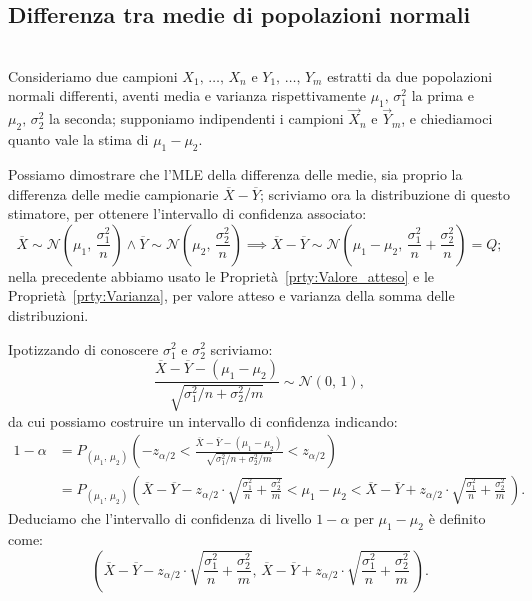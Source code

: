         \subsection{Differenza tra medie di popolazioni normali}
            \begin{defn}[Intervallo bilatero con $\mu_1=\mu_2=\,?,\, \sigma^2_1 = \sigma^2_{1,\,0},\, \sigma^2_2 = \sigma^2_{2,\,0}$]
                \hfill \\
                Consideriamo due campioni $X_1,\, \ldots,\, X_{n}$ e $Y_1,\, \ldots,\, Y_{m}$ estratti da 
                due popolazioni normali differenti, aventi media e varianza rispettivamente 
                $\mu_1,\, \sigma^2_1$ la prima e $\mu_2,\, \sigma^2_2$ la seconda; supponiamo indipendenti 
                i campioni $\vec{X}_n$ e $\vec{Y}_m$, e chiediamoci quanto vale la stima di $\mu_1-\mu_2$.

                Possiamo dimostrare che l'MLE della differenza delle medie, sia proprio la differenza delle 
                medie campionarie $\overline{X}-\overline{Y}$; scriviamo ora la distribuzione di questo 
                stimatore, per ottenere l'intervallo di confidenza associato: \[
                    \overline{X}\sim \mathcal{N}\left(\mu_1,\,\frac{\sigma^2_1}{n}\right) \land 
                    \overline{Y}\sim \mathcal{N}\left(\mu_2,\, \frac{\sigma^2_2}{n}\right) \implies
                    \overline{X}-\overline{Y} \sim \mathcal{N}\left(\mu_1-\mu_2,\, 
                    \frac{\sigma^2_1}{n} + \frac{\sigma^2_2}{n}\right) = Q
                ;\] nella precedente abbiamo usato le Proprietà~\ref{prty:Valore_atteso} e le 
                Proprietà~\ref{prty:Varianza}, per valore atteso e varianza della somma delle distribuzioni.

                Ipotizzando di conoscere $\sigma^2_1$ e $\sigma^2_2$ scriviamo: \[
                    \frac{\overline{X}-\overline{Y}- (\mu_1-\mu_2)}{\sqrt{\sigma^2_1 /n +\sigma^2_2 /m}} 
                    \sim \mathcal{N}(0,\,1)
                ,\] da cui possiamo costruire un intervallo di confidenza indicando:
                \begin{align*}
                    1-\alpha &= P_{(\mu_1,\,\mu_2)}\left(-z_{\alpha /2} < 
                    \frac{\overline{X}-\overline{Y}- (\mu_1-\mu_2)}{\sqrt{\sigma^2_1 /n +\sigma^2_2 /m}} < 
                    z_{\alpha /2}\right) \\
                             &= P_{(\mu_1,\,\mu_2)}\left(\overline{X}-\overline{Y}-z_{\alpha /2}\cdot \sqrt{\frac{\sigma^2_1}{n}+ \frac{\sigma^2_2}{m}}  < \mu_1-\mu_2 < \overline{X}-\overline{Y}+z_{\alpha /2}\cdot \sqrt{\frac{\sigma^2_1}{n} +\frac{\sigma^2_2}{m}}\,\right)
                .\end{align*}
                Deduciamo che l'intervallo di confidenza di livello $1-\alpha$ per $\mu_1-\mu_2$ è definito 
                come: \[
                    \left(\overline{X}-\overline{Y}-z_{\alpha /2}\cdot \sqrt{\frac{\sigma^2_1}{n}+ \frac{\sigma^2_2}{m}},\, \overline{X}-\overline{Y}+z_{\alpha /2}\cdot \sqrt{\frac{\sigma^2_1}{n} +\frac{\sigma^2_2}{m}}\,\right)
                .\] 
            \end{defn}
